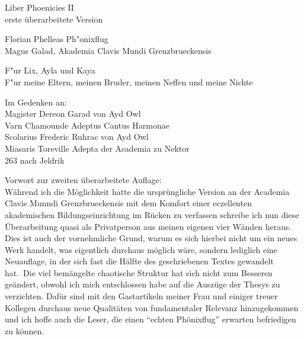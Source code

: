 \documentclass[a5paper,8pt]{book}
\begin{document}
%



\begin{center}
Liber Phoenicies II\\
erste überarbeitete Version\\

\vspace{30mm}

Florian Phelleas Ph"onixflug\\
Magus Galad, Akademia Clavis Mundi Grenzbrueckensis\\

\vspace{10mm}

F"ur Lix, Ayla und Kaya\\
F"ur meine Eltern, meinen Bruder, meinen Neffen und meine Nichte\\


\vspace{10mm}

Im Gedenken an: \\
Magister Dereon Garad von Ayd Owl \\
Varn Chamounde Adeptus Cantus Harmonae \\
Scolarius Frederic Ruhrac von Ayd Owl \\
Miasaris Toreville Adepta der Academia zu Nektor \\
263 nach Jeldrik\\
\end{center}

\newpage

Vorwort zur zweiten überarbeitete Auflage:\\
Während ich die Möglichkeit hatte die ursprüngliche Version an der Academia Clavis Munndi Grenzbrueckensis mit dem Komfort einer eczellenten akademischen Bildungseinrichtung im
Rücken zu verfassen schreibe ich nun diese Überarbeitung quasi als Privatperson aus meinen eigenen vier Wänden heraus. Dies ist auch der vornehmliche Grund, warum es sich hierbei
nicht um ein neues Werk handelt, was eigentlich durchaus möglich wäre, sondern lediglich eine Neuauflage, in der sich fast die Hälfte des geschriebenen Textes gewandelt hat.\
Die viel bemängelte chaotische Struktur hat sich nicht zum Besseren geändert, obwohl ich mich entschlossen habe auf die Auszüge der Thesys zu verzichten. Dafür sind mit den
Gastartikeln meiner Frau und einiger treuer Kollegen durchaus neue Qualitäten von fundamentaler Relevanz hinzugekommen und ich hoffe auch die Leser, die einen ``echten
Phönixflug'' erwarten befriedigen zu können.\\
\end{document}
